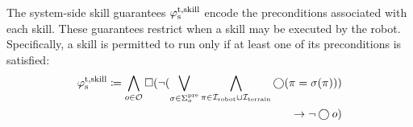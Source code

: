 The system-side skill guarantees $\varphi_\textrm{s}^\textrm{t,skill}$ encode the preconditions associated with each skill. These guarantees restrict when a skill may be executed by the robot. Specifically, a skill is permitted to run only if at least one of its preconditions is satisfied:
\begin{equation}
\begin{aligned}
    \varphi_\textrm{s}^\textrm{t,skill} \coloneqq 
    \bigwedge_{o \in \mathcal{O}} 
    \square (
    \neg (
    \bigvee_{\sigma\in\Sigma_{o}^{\textrm{pre}}}
    \bigwedge_{\pi\in {\mathcal I}_{\textrm{robot}} \cup {\mathcal I}_{\textrm{terrain}}}
    {\bigcirc(\pi = \sigma(\pi))}
    )
    \\
    \to \neg \bigcirc o)
\end{aligned}
\end{equation}
